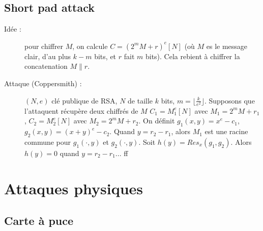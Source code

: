         \subsection{Short pad attack}
            \begin{description}
                \item[Idée :] pour chiffrer $M$, on calcule $C = (2^mM + r)^e [N]$ (où $M$ es le message clair, d'au plus $k - m$ bits, et $r$ fait $m$ bits). Cela rebient à chiffrer la concatenation $M \| r$.
                \item[Attaque (Coppersmith) :] $(N, e)$ clé publique de RSA, $N$ de taille $k$ bits, $m = \lfloor \frac k{e^2} \rfloor$. Supposons que l'attaquent récupère deux chiffrés de $M$ $C_1 = M_1^e [N]$ avec $M_1 = 2^mM + r_1$, $C_2 = M_2^e [N]$ avec $M_2 = 2^mM + r_2$. On définit $g_1(x, y) = x^e - c_1$, $g_2(x, y) = (x + y)^e - c_2$. Quand $y = r_2 - r_1$, alors $M_1$ est une racine commune pour $g_1(\cdot, y)$ et $g_2(\cdot, y)$. Soit $h(y) = Res_x(g_1, g_2)$. Alors $h(y) = 0$ quand $y = r_2 - r_1$... ff
            \end{description}

    \section{Attaques physiques}
        \subsection{Carte à puce}

